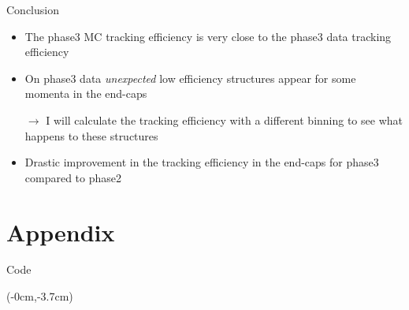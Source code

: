 \documentclass[8pt]{beamer}
\begin{document}
\begin{frame}{Conclusion}
	
	
	\begin{itemize}
		\item The phase3 MC tracking efficiency is very close to the phase3 data tracking efficiency


		\item On phase3 data \textit{unexpected} low efficiency structures appear  for some momenta in the end-caps 
		
		$\rightarrow$ I will calculate the tracking efficiency with a different binning to see what happens to these structures
		
		\item Drastic improvement in the tracking efficiency in the end-caps for phase3 compared to phase2
	\end{itemize}
	
	
	
	
\end{frame}



\appendix
\section{Appendix}
\begin{frame}{Code}


\lstset{language=Python}
\lstset{basicstyle=\normalsize}

\begin{textblock*}{\textwidth}(-0cm,-3.7cm)
	
	
	
	
\end{textblock*}


\end{frame}
\end{document}
